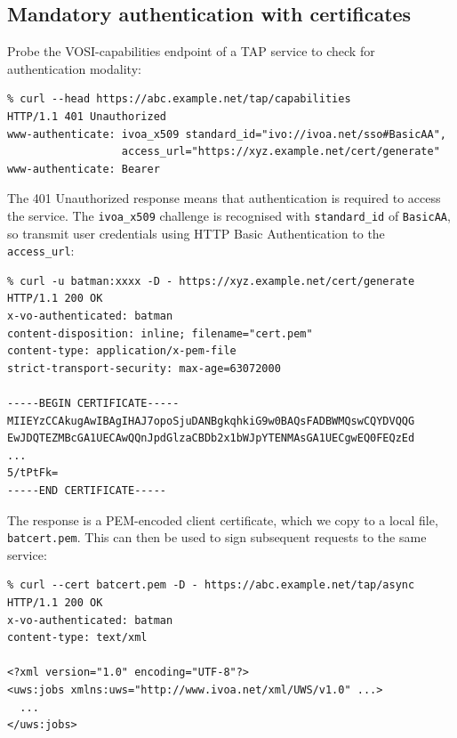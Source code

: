 \documentclass[11pt,a4paper]{ivoa}
\begin{document}
\subsection{Mandatory authentication with certificates}
\label{sec:x509-example}


Probe the VOSI-capabilities endpoint of a TAP service to check
for authentication modality:
{\footnotesize
\begin{verbatim}
% curl --head https://abc.example.net/tap/capabilities
HTTP/1.1 401 Unauthorized
www-authenticate: ivoa_x509 standard_id="ivo://ivoa.net/sso#BasicAA",
                  access_url="https://xyz.example.net/cert/generate"
www-authenticate: Bearer
\end{verbatim}
}

\noindent
The 401 Unauthorized response means that authentication
is required to access the service.
The \verb|ivoa_x509| challenge is recognised with \verb|standard_id|
of \verb|BasicAA|, so transmit user credentials using
HTTP Basic Authentication to the \verb|access_url|:

{\footnotesize
\begin{verbatim}
% curl -u batman:xxxx -D - https://xyz.example.net/cert/generate
HTTP/1.1 200 OK
x-vo-authenticated: batman
content-disposition: inline; filename="cert.pem"
content-type: application/x-pem-file
strict-transport-security: max-age=63072000

-----BEGIN CERTIFICATE-----
MIIEYzCCAkugAwIBAgIHAJ7opoSjuDANBgkqhkiG9w0BAQsFADBWMQswCQYDVQQG
EwJDQTEZMBcGA1UECAwQQnJpdGlzaCBDb2x1bWJpYTENMAsGA1UECgwEQ0FEQzEd
...
5/tPtFk=
-----END CERTIFICATE-----
\end{verbatim}
}

\noindent
The response is a PEM-encoded client certificate, which we copy
to a local file, \verb|batcert.pem|.
This can then be used to sign subsequent requests to the same service:
{\footnotesize
\begin{verbatim}
% curl --cert batcert.pem -D - https://abc.example.net/tap/async
HTTP/1.1 200 OK
x-vo-authenticated: batman
content-type: text/xml

<?xml version="1.0" encoding="UTF-8"?>
<uws:jobs xmlns:uws="http://www.ivoa.net/xml/UWS/v1.0" ...>
  ...
</uws:jobs>
\end{verbatim}
}
\end{document}
